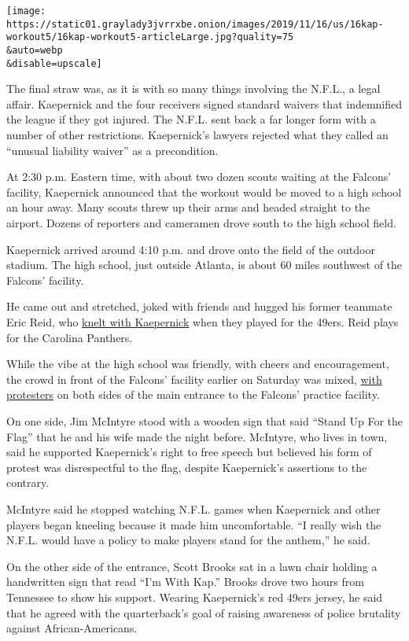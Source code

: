\texttt{[image: https://static01.graylady3jvrrxbe.onion/images/2019/11/16/us/16kap-workout5/16kap-workout5-articleLarge.jpg?quality=75\\\&auto=webp\\\&disable=upscale]}

The final straw was, as it is with so many things involving the N.F.L.,
a legal affair. Kaepernick and the four receivers signed standard
waivers that indemnified the league if they got injured. The N.F.L. sent
back a far longer form with a number of other restrictions. Kaepernick's
lawyers rejected what they called an ``unusual liability waiver'' as a
precondition.

At 2:30 p.m. Eastern time, with about two dozen scouts waiting at the
Falcons' facility, Kaepernick announced that the workout would be moved
to a high school an hour away. Many scouts threw up their arms and
headed straight to the airport. Dozens of reporters and cameramen drove
south to the high school field.

Kaepernick arrived around 4:10 p.m. and drove onto the field of the
outdoor stadium. The high school, just outside Atlanta, is about 60
miles southwest of the Falcons' facility.

He came out and stretched, joked with friends and hugged his former
teammate Eric Reid, who
\href{https://www.nytimes3xbfgragh.onion/2017/09/25/opinion/colin-kaepernick-football-protests.html}{knelt
with Kaepernick} when they played for the 49ers. Reid plays for the
Carolina Panthers.

While the vibe at the high school was friendly, with cheers and
encouragement, the crowd in front of the Falcons' facility earlier on
Saturday was mixed,
\href{https://www.nytimes3xbfgragh.onion/2019/11/15/sports/football/kaepernick-jay-z.html}{with
protesters} on both sides of the main entrance to the Falcons' practice
facility.

On one side, Jim McIntyre stood with a wooden sign that said ``Stand Up
For the Flag'' that he and his wife made the night before. McIntyre, who
lives in town, said he supported Kaepernick's right to free speech but
believed his form of protest was disrespectful to the flag, despite
Kaepernick's assertions to the contrary.

McIntyre said he stopped watching N.F.L. games when Kaepernick and other
players began kneeling because it made him uncomfortable. ``I really
wish the N.F.L. would have a policy to make players stand for the
anthem,'' he said.

On the other side of the entrance, Scott Brooks sat in a lawn chair
holding a handwritten sign that read ``I'm With Kap.'' Brooks drove two
hours from Tennessee to show his support. Wearing Kaepernick's red 49ers
jersey, he said that he agreed with the quarterback's goal of raising
awareness of police brutality against African-Americans.

